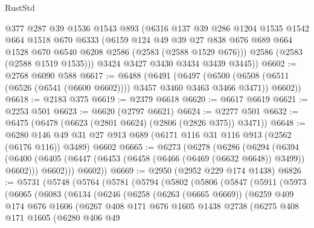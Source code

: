 \begin{lexlean}{RustStd}
\begin{coremodule}
{\begin{coremodule}
{{{{{{{{{{{{{{{        @377
        @287
        @39
        @1536
        @1543
        @893
        (@6316
          @137
          @39
          @286
          @1204
          @1535
          @1542
          @664
          @1518
          @670
          @6333
          (@6159
            @124
            @49
            @39
            @27
            @838
            @676
            @689
            @664
            @1528
            @670
            @6540
            @6208
            @2586
            (@2583 (@2588 @1529 @676)))
          @2586
          (@2583 (@2588 @1519 @1535)))
        @3424
        @3427
        @3430
        @3434
        @3439
        @3445))
@6602 := @2768 @6090 @588
@6617 := @6488
    (@6491
      (@6497
        (@6500 (@6508 (@6511 (@6526 (@6541 (@6600 @6602)))) @3457 @3460 @3463 @3466 @3471))
        @6602))
@6618 := @2183 @375
@6619 := @2379 @6618
@6620 := @6617 @6619
@6621 := @2253 @501
@6623 := @6620 (@2797 @6621)
@6624 := @2277 @501
@6632 := @6475 (@6478 (@6623 (@2801 @6624) (@2806 (@2826 @375)) @3471))
@6648 := @6280
    @146
    @49
    @31
    @27
    @913
    @689
    (@6171 @116 @31 @116 @913 (@2562 (@6176 @116)) @3489)
    @6602
@6665 := @6273
    (@6278
      (@6286
        (@6294
          (@6394
            (@6400
              (@6405 (@6447 (@6453 (@6458 (@6466 (@6469 (@6632 @6648)) @3499)) @6602)))
              @6602)))
        @6602))
@6669 := @2950 (@2952 @229 @174 @1438)
@6826 := @5731
    (@5748
      (@5764
        (@5781
          (@5794
            (@5802
              (@5806
                (@5847
                  (@5911
                    (@5973
                      (@6065
                        (@6083
                          (@6134
                            (@6246
                              (@6258
                                (@6263 (@6665 @6669))
                                (@6259
                                  @409
                                  @174
                                  @676
                                  @1606
                                  (@6267
                                    @408
                                    @171
                                    @676
                                    @1605
                                    @1438
                                    @2738
                                    (@6275
                                      @408
                                      @171
                                      @1605
                                      (@6280
                                        @406
                                        @49
}}}}}}}}}}}}}}}
\end{coremodule}}
\end{coremodule}
\end{lexlean}
